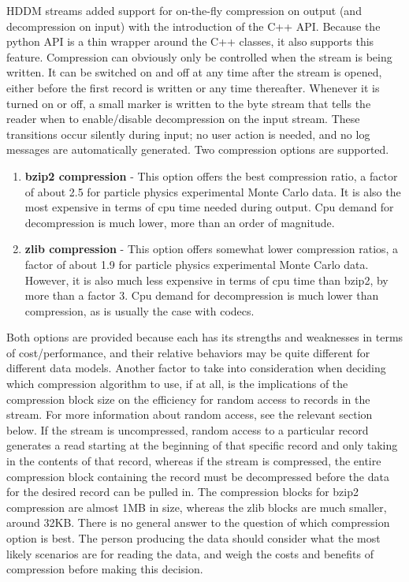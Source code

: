 \documentclass{revtex4}
\begin{document}
HDDM streams added support for on-{}the-{}fly compression on output (and 
decompression on input) with the introduction of the C++ API. Because the 
python API is a thin wrapper around the C++ classes, it also supports this
feature. Compression can obviously only be controlled when the stream is
being written. It can be switched on and off at any time after the stream
is opened, either before the first record is written or any time thereafter.
Whenever it is turned on or off, a small marker is written to the byte
stream that tells the reader when to enable/disable decompression on the
input stream. These transitions occur silently during input; no user
action is needed, and no log messages are automatically generated. Two
compression options are supported.

\begin{enumerate}
\item{\bf bzip2 compression} -{}
This option offers the best compression ratio, a factor of about 2.5 for
particle physics experimental Monte Carlo data. It is also the most 
expensive in terms of cpu time needed during output. Cpu demand for
decompression is much lower, more than an order of magnitude.
\item{\bf zlib compression} -{}
This option offers somewhat lower compression ratios, a factor of about 
1.9 for particle physics experimental Monte Carlo data. However, it is
also much less expensive in terms of cpu time than bzip2, by more than
a factor 3. Cpu demand for decompression is much lower than compression,
as is usually the case with codecs.
\end{enumerate}

Both options are provided because each has its strengths and weaknesses
in terms of cost/performance, and their relative behaviors may be quite
different for different data models. Another factor to take into 
consideration when deciding which compression algorithm to use, if at all,
is the implications of the compression block size on the efficiency for
random access to records in the stream. For more information about random
access, see the relevant section below. If the stream is uncompressed,
random access to a particular record generates a read starting at the
beginning of that specific record and only taking in the contents of 
that record, whereas if the stream is compressed, the entire compression
block containing the record must be decompressed before the data for the
desired record can be pulled in. The compression blocks for bzip2 
compression are almost 1MB in size, whereas the zlib blocks are much
smaller, around 32KB. There is no general answer to the question of which
compression option is best. The person producing the data should consider
what the most likely scenarios are for reading the data, and weigh the
costs and benefits of compression before making this decision.
\end{document}
